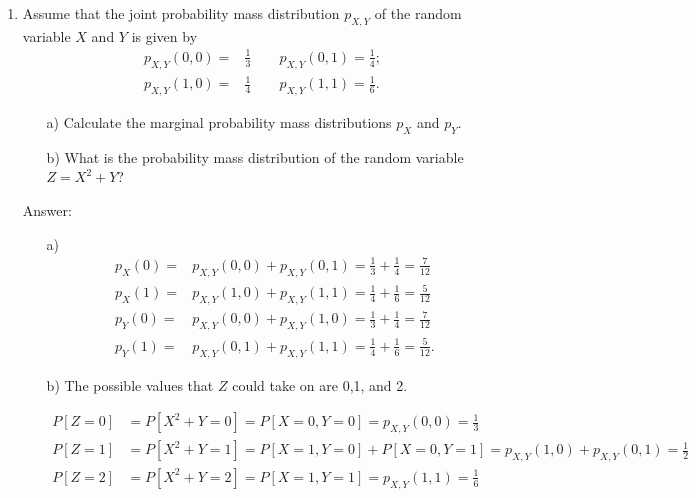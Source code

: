 \documentclass{article}
\begin{document}
\begin{enumerate}
\begin{itemize}
\end{itemize}


\newpage
\item 

Assume that the joint probability mass distribution $p_{X,Y}$ of the random variable $X$ and $Y$ is given by
\begin{align*}
p_{X,Y}(0,0) =& \frac{1}{3} \qquad p_{X,Y}(0,1)= \frac{1}{4};\\
p_{X,Y}(1,0) =& \frac{1}{4} \qquad  p_{X,Y}(1,1) = \frac{1}{6}.
\end{align*}

\begin{itemize}
	\item[a)] Calculate the marginal probability mass distributions $p_X$ and $p_Y$.
	\item[b)] What is the probability mass distribution of the random variable $Z = X^2 + Y$?
\end{itemize}

Answer:

\begin{itemize}
		\item[a)]
		\begin{align*}
		p_X(0) = &p_{X,Y}(0,0) + p_{X,Y}(0,1) = \frac{1}{3} + \frac{1}{4} = \frac{7}{12}\\
		p_X(1) = &p_{X,Y}(1,0) + p_{X,Y}(1,1) = \frac{1}{4} + \frac{1}{6} = \frac{5}{12}\\
		p_Y(0) = &p_{X,Y}(0,0) + p_{X,Y}(1,0) = \frac{1}{3} + \frac{1}{4} = \frac{7}{12}\\
		p_Y(1) = &p_{X,Y}(0,1) + p_{X,Y}(1,1) = \frac{1}{4} + \frac{1}{6} = \frac{5}{12}.
		\end{align*}
		
		\item[b)] The possible values that $Z$ could take on are 0,1, and 2.
		
		\begin{align*}
		P[Z = 0] &= P[X^2 + Y = 0] = P[X = 0, Y = 0] = p_{X,Y}(0,0) = \frac{1}{3} \\
		P[Z = 1] &= P[X^2 + Y = 1] = P[X = 1, Y = 0] + P[X = 0, Y = 1] = p_{X,Y}(1,0) + p_{X,Y}(0,1) = \frac{1}{2} \\
		P[Z = 2] &= P[X^2 + Y = 2] = P[X = 1, Y = 1] = p_{X,Y}(1,1) = \frac{1}{6} \\
		\end{align*}
		

\end{itemize}
\end{enumerate}
\end{document}
